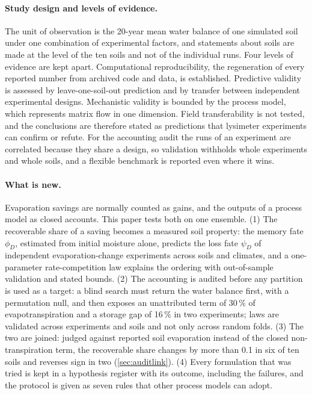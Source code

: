 \paragraph{Study design and levels of evidence.} The unit of observation is the 20-year mean water balance of one simulated soil under one combination of experimental factors, and statements about soils are made at the level of the ten soils and not of the individual runs. Four levels of evidence are kept apart. Computational reproducibility, the regeneration of every reported number from archived code and data, is established. Predictive validity is assessed by leave-one-soil-out prediction and by transfer between independent experimental designs. Mechanistic validity is bounded by the process model, which represents matrix flow in one dimension. Field transferability is not tested, and the conclusions are therefore stated as predictions that lysimeter experiments can confirm or refute. For the accounting audit the runs of an experiment are correlated because they share a design, so validation withholds whole experiments and whole soils, and a flexible benchmark is reported even where it wins.

\paragraph{What is new.} Evaporation savings are normally counted as gains, and the outputs of a process model as closed accounts. This paper tests both on one ensemble. (1) The recoverable share of a saving becomes a measured soil property: the memory fate $\phi_D$, estimated from initial moisture alone, predicts the loss fate $\psi_D$ of independent evaporation-change experiments across soils and climates, and a one-parameter rate-competition law explains the ordering with out-of-sample validation and stated bounds. (2) The accounting is audited before any partition is used as a target: a blind search must return the water balance first, with a permutation null, and then exposes an unattributed term of 30\,\% of evapotranspiration and a storage gap of 16\,\% in two experiments; laws are validated across experiments and soils and not only across random folds. (3) The two are joined: judged against reported soil evaporation instead of the closed non-transpiration term, the recoverable share changes by more than 0.1 in six of ten soils and reverses sign in two (\cref{sec:auditlink}). (4) Every formulation that was tried is kept in a hypothesis register with its outcome, including the failures, and the protocol is given as seven rules that other process models can adopt.

